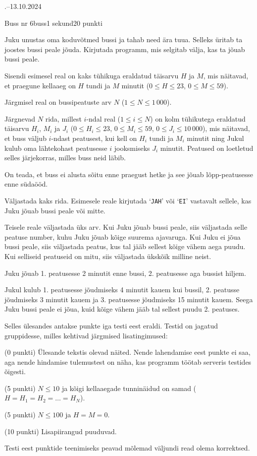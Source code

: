 \documentclass[a4paper,11pt]{article}
\begin{document}
\begin{ol}{\eio}{.--13.10.2024}{\yle}{}
\begin{yl}{1}{Buss nr 6}{buss}{1 sekund}{20 punkti}

Juku unustas oma koduvõtmed bussi ja tahab need ära tuua. Selleks üritab ta joostes bussi peale jõuda. Kirjutada programm, mis selgitab välja, kas ta jõuab bussi peale.

\sis Sisendi esimesel real on kaks tühikuga eraldatud täisarvu $H$ ja $M$, mis näitavad, et praegune kellaaeg on $H$ tundi ja $M$ minutit ($0 \le H \le 23$, $0 \le M \le 59$).

Järgmisel real on bussipeatuste arv $N$ ($1 \le N \le 1\,000$).

Järgnevad $N$ rida, millest $i$-ndal real ($1 \le i \le N$) on kolm tühikutega eraldatud täisarvu $H_i$, $M_i$ ja $J_i$ ($0 \le H_i \le 23$, $0 \le M_i \le 59$, $0 \le J_i \le 10\,000$), mis näitavad, et buss väljub $i$-ndast peatusest, kui kell on $H_i$ tundi ja $M_i$ minutit ning Jukul kulub oma lähtekohast peatusesse $i$ jooksmiseks $J_i$ minutit. Peatused on loetletud selles järjekorras, milles buss neid läbib.

On teada, et buss ei alusta sõitu enne praegust hetke ja see jõuab lõpp-peatusesse enne südaööd.

\val Väljastada kaks rida. Esimesele reale kirjutada `\verb/JAH/' või `\verb/EI/' vastavalt sellele, kas Juku jõuab bussi peale või mitte.

Teisele reale väljastada üks arv. Kui Juku jõuab bussi peale, siis väljastada selle peatuse number, kuhu Juku jõuab kõige suurema ajavaruga. Kui Juku ei jõua bussi peale, siis väljastada peatus, kus tal jääb sellest kõige vähem aega puudu. Kui selliseid peatuseid on mitu, siis väljastada ükskõik milline neist.

\nde[0]{3cm}{3cm}

Juku jõuab 1. peatusesse 2 minutit enne bussi, 2. peatusesse aga bussist hiljem.

\nde[1]{3cm}{3cm}

Jukul kulub 1. peatusesse jõudmiseks 4 minutit kauem kui bussil, 2. peatusse jõudmiseks 3 minutit kauem ja 3. peatusesse jõudmiseks 15 minutit kauem. Seega Juku bussi peale ei jõua, kuid kõige vähem jääb tal sellest puudu 2. peatuses.

\hnd Selles ülesandes antakse punkte iga testi eest eraldi. Testid on jagatud gruppidesse, milles kehtivad järgmised lisatingimused:
\begin{xenum}
  \item (0 punkti) Ülesande tekstis olevad näited. Nende lahendamise eest punkte ei saa, aga nende hindamise tulemustest on näha, kas programm töötab serveris testides õigesti.
  \item (5 punkti) $N \le 10$ ja kõigi kellaaegade tunninäidud on samad ($H = H_1 = H_2 = \ldots = H_N$).
  \item (5 punkti) $N \le 100$ ja $H = M = 0$.
  \item (10 punkti) Lisapiirangud puuduvad.
\end{xenum}
Testi eest punktide teenimiseks peavad mõlemad väljundi read olema korrektsed.

\end{yl}
\end{ol}
\end{document}
